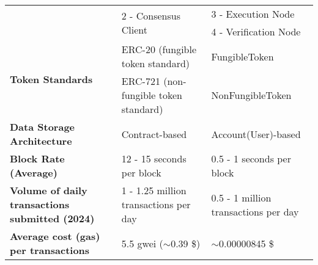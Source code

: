 \documentclass[../main.tex]{subfiles}
\begin{document}
\begin{table*}[h]
\begin{adjustwidth}{-1.5cm}{}
\begin{tabular}{@{} m{4cm} ll@{}}
                                                                    & \multicolumn{1}{l}{\multirow{2}{*}{2 - Consensus Client}}           & 3 - Execution Node                   \\ \cmidrule(l){3-3}
                                                                    & \multicolumn{1}{l}{}                                                & 4 - Verification Node                \\ \midrule
            \multirow{2}{*}{\textbf{Token Standards}}               & \multicolumn{1}{l}{ERC-20 (fungible token standard)}                & FungibleToken                        \\ \cmidrule(l){2-3}
                                                                    & \multicolumn{1}{l}{ERC-721 (non-fungible token standard)}           & NonFungibleToken                     \\ \midrule
            \textbf{Data Storage Architecture}                      & \multicolumn{1}{l}{Contract-based}                                  & Account(User)-based                  \\ \midrule
            \textbf{Block Rate (Average)}                           & \multicolumn{1}{l}{12 - 15 seconds per block}                       & 0.5 - 1 seconds per block            \\ \midrule
            \textbf{Volume of daily transactions submitted (2024)}  & \multicolumn{1}{l}{1 - 1.25 million transactions per day}           & 0.5 - 1 million transactions per day \\ \midrule
            \textbf{Average cost (gas) per transactions}            & \multicolumn{1}{l}{5.5 gwei ($\sim$0.39 \$)}                        & $\sim$0.00000845 \$                  \\ \bottomrule
        \end{tabular}
    \end{adjustwidth}
    \label{tab:ethereum_flow_comparison_table}
\end{table*}
\end{document}
